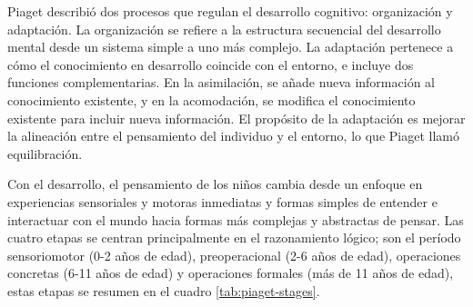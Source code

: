 \documentclass[11pt,letterpaper]{report}
\begin{document}
Piaget describió dos procesos que regulan el desarrollo cognitivo: organización
y adaptación. La organización se refiere a la estructura secuencial del
desarrollo mental desde un sistema simple a uno más complejo. La adaptación
pertenece a cómo el conocimiento en desarrollo coincide con el entorno, e
incluye dos funciones complementarias. En la asimilación, se añade nueva
información al conocimiento existente, y en la acomodación, se modifica el
conocimiento existente para incluir nueva información. El propósito de la
adaptación es mejorar la alineación entre el pensamiento del individuo y el
entorno, lo que Piaget llamó equilibración. \cite{Gauvain2022}

Con el desarrollo, el pensamiento de los niños cambia desde un enfoque en
experiencias sensoriales y motoras inmediatas y formas simples de entender e
interactuar con el mundo hacia formas más complejas y abstractas de pensar. Las
cuatro etapas se centran principalmente en el razonamiento lógico; son el
período sensoriomotor (0-2 años de edad), preoperacional (2-6 años de edad),
operaciones concretas (6-11 años de edad) y operaciones formales (más de 11
años de edad), estas etapas se resumen en el cuadro \ref{tab:piaget-stages}.
\cite{Gauvain2022}
\end{document}
